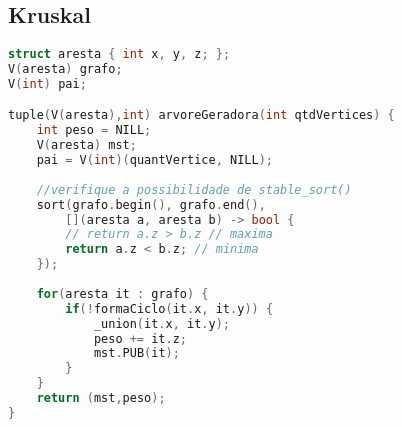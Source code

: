 \subsection{Kruskal}
\begin{lstlisting}[language=C++, title={Algoritmo de Kruskal}]
struct aresta { int x, y, z; };
V(aresta) grafo;
V(int) pai;

tuple(V(aresta),int) arvoreGeradora(int qtdVertices) {
	int peso = NILL;
    V(aresta) mst;
	pai = V(int)(quantVertice, NILL);
    
    //verifique a possibilidade de stable_sort()
    sort(grafo.begin(), grafo.end(), 
    	[](aresta a, aresta b) -> bool {
    	// return a.z > b.z // maxima
        return a.z < b.z; // minima
    });
    
	for(aresta it : grafo) {
		if(!formaCiclo(it.x, it.y)) {
			_union(it.x, it.y);
			peso += it.z;
            mst.PUB(it);
		}
	}
	return (mst,peso);
}
\end{lstlisting}